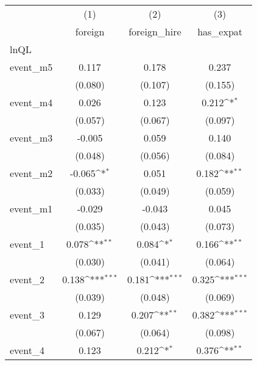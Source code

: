 {
\def\sym#1{\ifmmode^{#1}\else\(^{#1}\)\fi}
\begin{tabular}{l*{3}{c}}
\hline\hline
            &\multicolumn{1}{c}{(1)}&\multicolumn{1}{c}{(2)}&\multicolumn{1}{c}{(3)}\\
            &\multicolumn{1}{c}{foreign}&\multicolumn{1}{c}{foreign\_hire}&\multicolumn{1}{c}{has\_expat}\\
\hline
lnQL        &                     &                     &                     \\
event\_m5    &       0.117         &       0.178         &       0.237         \\
            &     (0.080)         &     (0.107)         &     (0.155)         \\
[1em]
event\_m4    &       0.026         &       0.123         &       0.212\sym{*}  \\
            &     (0.057)         &     (0.067)         &     (0.097)         \\
[1em]
event\_m3    &      -0.005         &       0.059         &       0.140         \\
            &     (0.048)         &     (0.056)         &     (0.084)         \\
[1em]
event\_m2    &      -0.065\sym{*}  &       0.051         &       0.182\sym{**} \\
            &     (0.033)         &     (0.049)         &     (0.059)         \\
[1em]
event\_m1    &      -0.029         &      -0.043         &       0.045         \\
            &     (0.035)         &     (0.043)         &     (0.073)         \\
[1em]
event\_1     &       0.078\sym{**} &       0.084\sym{*}  &       0.166\sym{**} \\
            &     (0.030)         &     (0.041)         &     (0.064)         \\
[1em]
event\_2     &       0.138\sym{***}&       0.181\sym{***}&       0.325\sym{***}\\
            &     (0.039)         &     (0.048)         &     (0.069)         \\
[1em]
event\_3     &       0.129         &       0.207\sym{**} &       0.382\sym{***}\\
            &     (0.067)         &     (0.064)         &     (0.098)         \\
[1em]
event\_4     &       0.123         &       0.212\sym{*}  &       0.376\sym{**} \\

\end{tabular}}
